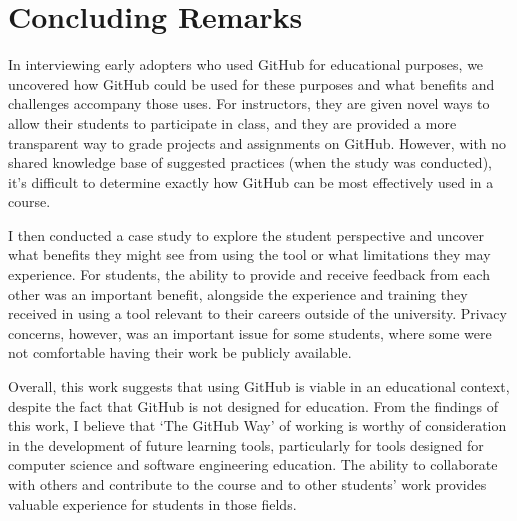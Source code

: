 \section{Concluding Remarks}
In interviewing early adopters who used GitHub for educational purposes, we uncovered how GitHub could be used for these purposes and what benefits and challenges accompany those uses. For instructors, they are given novel ways to allow their students to participate in class, and they are provided a more transparent way to grade projects and assignments on GitHub. However, with no shared knowledge base of suggested practices (when the study was conducted), it's difficult to determine exactly how GitHub can be most effectively used in a course.

I then conducted a case study to explore the student perspective and uncover what benefits they might see from using the tool or what limitations they may experience. For students, the ability to provide and receive feedback from each other was an important benefit, alongside the experience and training they received in using a tool relevant to their careers outside of the university. Privacy concerns, however, was an important issue for some students, where some were not comfortable having their work be publicly available.

Overall, this work suggests that using GitHub is viable in an educational context, despite the fact that GitHub is not designed for education. From the findings of this work, I believe that `The GitHub Way' of working is worthy of consideration in the development of future learning tools, particularly for tools designed for computer science and software engineering education. The ability to collaborate with others and contribute to the course and to other students' work provides valuable experience for students in those fields.
